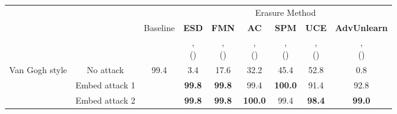 \begin{tabular}{c|c|c|c|c|c|c|c|c}
    \toprule
    &&& \multicolumn{6}{c}{Erasure Method} \\
        \cmidrule(lr){4-9} 
        && Baseline & \textbf{ESD} & \textbf{FMN} & \textbf{AC} & \textbf{SPM} & \textbf{UCE} & \textbf{AdvUnlearn} \\
        &&  &\shortstack{\citeauthor{gandikotaErasingConceptsDiffusion2023}, \\ (\citeyear{gandikotaErasingConceptsDiffusion2023})} & \shortstack{\citeauthor{zhangForgetmenotLearningForget2024}, \\ (\citeyear{zhangForgetmenotLearningForget2024})} & \shortstack{\citeauthor{kumariAblatingConceptsTexttoimage2023}, \\ (\citeyear{kumariAblatingConceptsTexttoimage2023})} & \shortstack{\citeauthor{lyuOnedimensionalAdapterRule2024}, \\ (\citeyear{lyuOnedimensionalAdapterRule2024})} & \shortstack{\citeauthor{gandikotaUnifiedConceptEditing2023}, \\ (\citeyear{gandikotaUnifiedConceptEditing2023})} & \shortstack{\citeauthor{zhangDefensiveUnlearningAdversarial2024}, \\ (\citeyear{zhangDefensiveUnlearningAdversarial2024})}\\
        \midrule
        \multirow{3}{*}{Van Gogh style} & No attack & 99.4  & 3.4 & 17.6 & 32.2 & 45.4 &  52.8 & 0.8\\
        & Embed attack 1 & & \textbf{99.8} & \textbf{99.8} & 99.4 & \textbf{100.0} & 91.4 & 92.8 \\
        & Embed attack 2 &&  \textbf{99.8} & \textbf{99.8} & \textbf{100.0} & 99.4 & \textbf{98.4} & \textbf{99.0} \\
    \bottomrule
    \end{tabular}